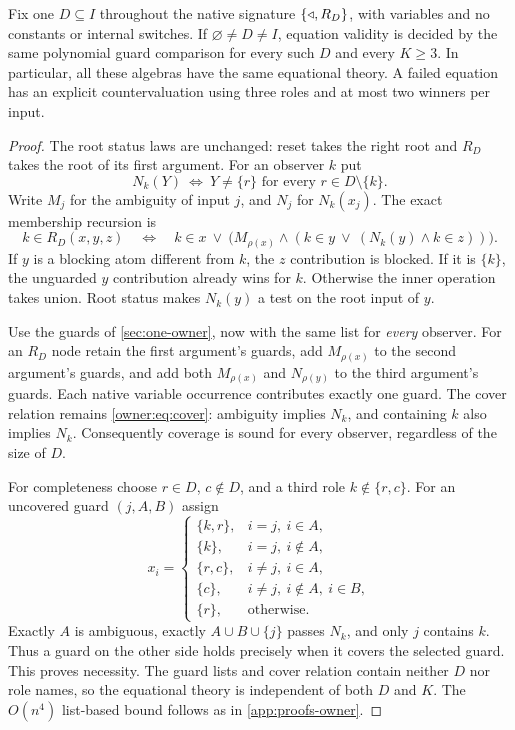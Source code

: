 \begin{theorem}\label{selective:thm:guards}
Fix one $D\subseteq I$ throughout the native signature
$\{\mathbin{\triangleleft},R_D\}$, with variables and no constants or internal switches.
If $\varnothing\ne D\ne I$, equation validity is
decided by the same polynomial guard comparison for every such $D$
and every $K\geq3$. In particular, all these algebras have the same
equational theory. A failed equation has an explicit countervaluation
using three roles and at most two winners per input.
\end{theorem}
\begin{proof}
The root status laws are unchanged: reset takes the right root and
$R_D$ takes the root of its first argument. For an observer $k$ put
\[
 N_k(Y)\ \Longleftrightarrow\
 Y\ne\{r\}\text{ for every }r\in D\setminus\{k\}.
\]
Write $M_j$ for the ambiguity of input $j$, and $N_j$ for $N_k(x_j)$. The exact membership recursion is
\[
 k\in R_D(x,y,z)\quad\Longleftrightarrow\quad
 k\in x\ \lor\
 \bigl(M_{\rho(x)}\land
       (k\in y\ \lor\ (N_k(y)\land k\in z))\bigr).
\]
If $y$ is a blocking atom different from $k$, the $z$ contribution is
blocked. If it is $\{k\}$, the unguarded $y$ contribution already wins
for $k$. Otherwise the inner operation takes union. Root status makes
$N_k(y)$ a test on the root input of $y$.

Use the guards of \cref{sec:one-owner}, now with the same list for
\emph{every} observer. For an $R_D$ node retain the first argument's
guards, add $M_{\rho(x)}$ to the second argument's guards, and add both
$M_{\rho(x)}$ and $N_{\rho(y)}$ to the third argument's guards.
Each native variable occurrence contributes exactly one guard.
The cover relation remains \eqref{owner:eq:cover}: ambiguity implies
$N_k$, and containing $k$ also implies $N_k$. Consequently coverage
is sound for every observer, regardless of the size of $D$.

For completeness choose $r\in D$, $c\notin D$, and a third role
$k\notin\{r,c\}$. For an uncovered guard $(j,A,B)$ assign
\[
 x_i=\begin{cases}
 \{k,r\},&i=j,\ i\in A,\\
 \{k\},&i=j,\ i\notin A,\\
 \{r,c\},&i\ne j,\ i\in A,\\
 \{c\},&i\ne j,\ i\notin A,\ i\in B,\\
 \{r\},&\text{otherwise}.
 \end{cases}
 \]
Exactly $A$ is ambiguous, exactly $A\cup B\cup\{j\}$ passes $N_k$,
and only $j$ contains $k$. Thus a guard on the other side holds
precisely when it covers the selected guard. This proves necessity.
The guard lists and cover relation contain neither $D$ nor role names,
so the equational theory is independent of both $D$ and $K$.
The $O(n^4)$ list-based bound follows as in \cref{app:proofs-owner}.
\end{proof}

